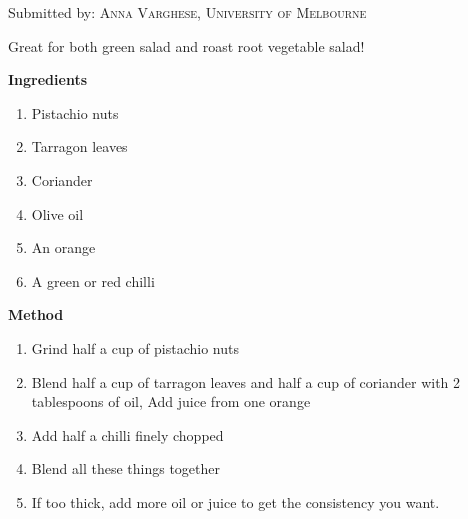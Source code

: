 

Submitted by: \textsc{Anna Varghese, University of Melbourne}


\begin{shadequote*}
Great for both green salad and roast root vegetable salad!
\end{shadequote*}
\hrulefill

\textbf{Ingredients}

\begin{enumerate}[before=\itshape,font=\normalfont]
\item Pistachio nuts
\item Tarragon leaves
\item Coriander
\item Olive oil
\item An orange
\item A green or red chilli

\end{enumerate}

\hrulefill

\textbf{Method}

\begin{enumerate}
\item Grind half a cup of pistachio nuts 
\item Blend half a cup of tarragon leaves and half a cup of coriander with 2 tablespoons of oil, Add juice from one orange
\item Add half a chilli finely chopped
\item Blend all these things together 
\item If too thick, add more oil or juice to get the consistency you want.
\end{enumerate}




\vfill
\pagebreak


